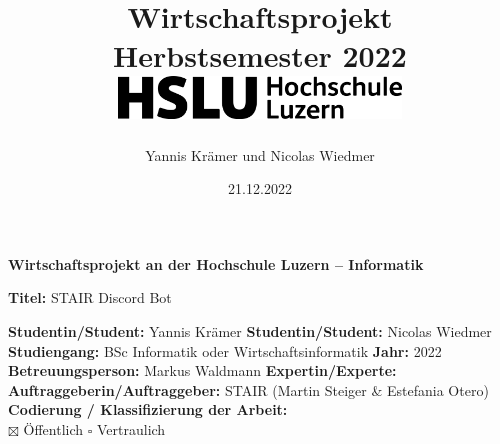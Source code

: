 \documentclass[a4paper, table]{article}
\title{
    {Wirtschaftsprojekt} \\
    \vspace{10mm}
    { Herbstsemester 2022 } \\
    \vspace{10mm}
    {\includegraphics[width=75mm]{img/hsluLogo2022.png}}
}
\author{Yannis Kr\"amer und Nicolas Wiedmer}
\date{21.12.2022}
\begin{document}
\maketitle

\newpage

\noindent
\fontsize{12}{14}
\textbf{Wirtschaftsprojekt an der Hochschule Luzern -- Informatik} \\ \vspace*{0.6cm}

\fontsize{10.95}{12}
\noindent
\textbf{Titel:} STAIR Discord Bot \\ \vspace*{0.2cm}

\noindent
\textbf{Studentin/Student:} Yannis Kr\"amer \newline \newline
\textbf{Studentin/Student:} Nicolas Wiedmer \newline \newline
\textbf{Studiengang:} BSc Informatik oder Wirtschaftsinformatik  \newline \newline
\textbf{Jahr:} 2022 \newline \newline
\textbf{Betreuungsperson:} Markus Waldmann \newline \newline
\textbf{Expertin/Experte:} \newline \newline
\textbf{Auftraggeberin/Auftraggeber:} STAIR (Martin Steiger \& Estefania Otero)\newline \newline \newline
\textbf{Codierung / Klassifizierung der Arbeit:}\\
$\boxtimes$ \"Offentlich
$\square$ Vertraulich


\end{document}
